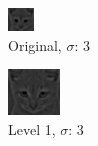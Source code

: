 \documentclass{article}
\begin{document}
\begin{minipage}{\linewidth}
    \centering
    \begin{minipage}{0.45\linewidth}
        \begin{figure}[H]
			\includegraphics[width=\linewidth]{Ejercicio2e/cat0.png}          
			\caption{Original, $\sigma$: 3}
        \end{figure}
    \end{minipage}
    \hspace{0.05\linewidth}
    \begin{minipage}{0.45\linewidth}
        \begin{figure}[H]
            \includegraphics[width=\linewidth]{Ejercicio2e/cat1.png}          
			\caption{Level 1, $\sigma$: 3}
        \end{figure}
    \end{minipage}
    

\end{minipage}
\end{document}
